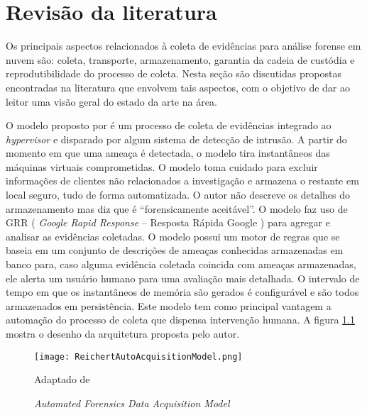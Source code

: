 \chapter{Revisão da literatura}
\label{chp:revisão}

Os principais aspectos relacionados à coleta de evidências para análise forense em nuvem são: coleta, transporte, armazenamento, garantia da cadeia de custódia e reprodutibilidade do processo de coleta. 
%
Nesta seção são discutidas propostas encontradas na literatura que envolvem tais aspectos, com o objetivo de dar ao leitor uma visão geral do estado da arte na área.


O modelo proposto por \cite{ReichertAutoAcquisition:2015} é um processo de coleta de evidências integrado ao \textit{hypervisor} e disparado por algum sistema de detecção de intrusão. 
%
A partir do momento em que uma ameaça é detectada, o modelo tira instantâneos das máquinas virtuais comprometidas. O modelo toma cuidado para excluir informações de clientes não relacionados a investigação e armazena o restante em local seguro, tudo de forma automatizada.
%
O autor não descreve os detalhes do armazenamento mas diz que é ``forensicamente aceitável''.
%
O modelo faz uso de GRR ( \textit{Google Rapid Response} -- Resposta Rápida Google ) para agregar e analisar as evidências coletadas. 
%
O modelo possui um motor de regras que se baseia em um conjunto de descrições de ameaças conhecidas armazenadas em banco para, caso alguma evidência coletada coincida com ameaças armazenadas, ele alerta um usuário humano para uma avaliação mais detalhada.
%
O intervalo de tempo em que os instantâneos de memória são gerados é configurável e são todos armazenados em persistência.
%
Este modelo tem como principal vantagem a automação do processo de coleta que dispensa intervenção humana. 
%
A figura \ref{fig:ReichertAutoAcquisitionModel} mostra o desenho da arquitetura proposta pelo autor.

\begin{figure}[htb!]
\footnotesize
\caption{\textit{Automated Forensics Data Acquisition Model}}
\texttt{[image: ReichertAutoAcquisitionModel.png]}
\centering
\label{fig:ReichertAutoAcquisitionModel}
\begin{center}
Adaptado de \cite{ReichertAutoAcquisition:2015} 
\end{center}
\end{figure}


